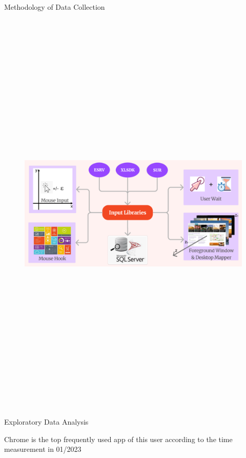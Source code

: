 \documentclass[final]{beamer}
\newlength{\colwidth}
\begin{document}
\begin{frame}[t]
\begin{columns}[t]
\begin{column}{\colwidth}
\begin{alertblock}{\huge{Methodology of Data Collection}}
          \begin{figure}
          \includegraphics[width=0.96 \textwidth, height=20cm]{collect-data.jpeg}
          
          \end{figure}
      \end{alertblock}

      \begin{block}{\huge{Exploratory Data Analysis}}

        {\fontsize{37pt}{44.4pt} \selectfont Chrome is the top frequently used app of this user according to the time measurement in 01/2023}


\end{block}
\end{column}
\end{columns}
\end{frame}
\end{document}
